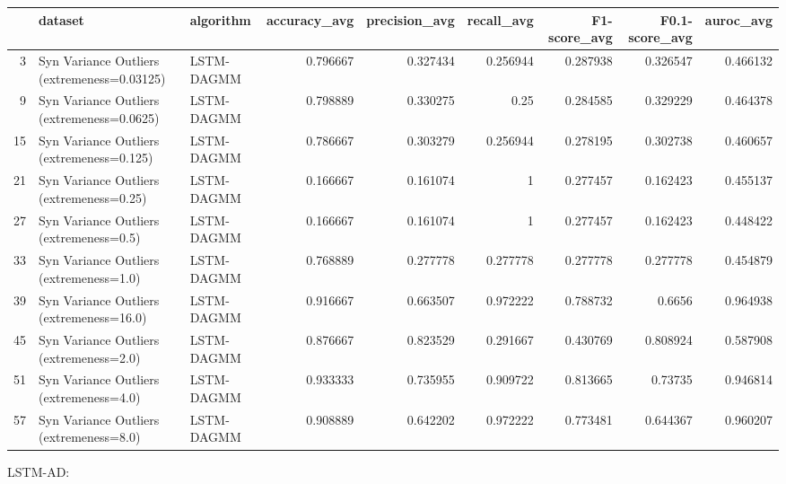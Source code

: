 \begin{tabular}{rllrrrrrr}
\hline
    & dataset                                     & algorithm   &   accuracy\_avg &   precision\_avg &   recall\_avg &   F1-score\_avg &   F0.1-score\_avg &   auroc\_avg \\
\hline
  3 & Syn Variance Outliers (extremeness=0.03125) & LSTM-DAGMM  &       0.796667 &        0.327434 &     0.256944 &       0.287938 &         0.326547 &    0.466132 \\
  9 & Syn Variance Outliers (extremeness=0.0625)  & LSTM-DAGMM  &       0.798889 &        0.330275 &     0.25     &       0.284585 &         0.329229 &    0.464378 \\
 15 & Syn Variance Outliers (extremeness=0.125)   & LSTM-DAGMM  &       0.786667 &        0.303279 &     0.256944 &       0.278195 &         0.302738 &    0.460657 \\
 21 & Syn Variance Outliers (extremeness=0.25)    & LSTM-DAGMM  &       0.166667 &        0.161074 &     1        &       0.277457 &         0.162423 &    0.455137 \\
 27 & Syn Variance Outliers (extremeness=0.5)     & LSTM-DAGMM  &       0.166667 &        0.161074 &     1        &       0.277457 &         0.162423 &    0.448422 \\
 33 & Syn Variance Outliers (extremeness=1.0)     & LSTM-DAGMM  &       0.768889 &        0.277778 &     0.277778 &       0.277778 &         0.277778 &    0.454879 \\
 39 & Syn Variance Outliers (extremeness=16.0)    & LSTM-DAGMM  &       0.916667 &        0.663507 &     0.972222 &       0.788732 &         0.6656   &    0.964938 \\
 45 & Syn Variance Outliers (extremeness=2.0)     & LSTM-DAGMM  &       0.876667 &        0.823529 &     0.291667 &       0.430769 &         0.808924 &    0.587908 \\
 51 & Syn Variance Outliers (extremeness=4.0)     & LSTM-DAGMM  &       0.933333 &        0.735955 &     0.909722 &       0.813665 &         0.73735  &    0.946814 \\
 57 & Syn Variance Outliers (extremeness=8.0)     & LSTM-DAGMM  &       0.908889 &        0.642202 &     0.972222 &       0.773481 &         0.644367 &    0.960207 \\
\hline
\end{tabular}

LSTM-AD:

